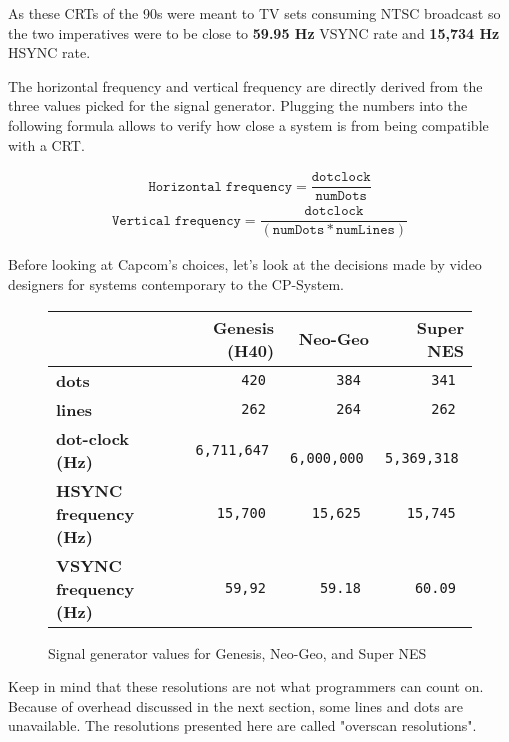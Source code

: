 As these CRTs of the 90s were meant to TV sets consuming NTSC broadcast so the two imperatives were to be close to \textbf{59.95 Hz} VSYNC rate and \textbf{15,734 Hz} HSYNC rate. 



The horizontal frequency and vertical frequency are directly derived from the three values picked for the signal generator. Plugging the numbers into the following formula allows to verify how close a system is from being compatible with a CRT.

\begin{align*}
 \mathtt{Horizontal\; frequency} = \dfrac{\mathtt{dotclock}}{\mathtt{numDots}}
\end{align*}
\begin{align*}
\mathtt{Vertical\; frequency} =   \dfrac{\mathtt{dotclock}}{\mathtt{(numDots * numLines)}}
\end{align*}


Before looking at Capcom's choices, let's look at the decisions made by video designers for systems contemporary to the CP-System. 


\begin{figure}[H]
{ \setlength{\tabcolsep}{3.0pt}
\begin{tabularx}{\textwidth}{Xrrr} 
  \textbf{ } & \textbf{Genesis (H40)\cite{h40}} & \textbf{ Neo-Geo }  & \textbf{ Super NES } \\               
  \toprule    
   \textbf{dots} & \texttt{ 420 } & \texttt{ 384 }  & \texttt{ 341 } \\ 
   \textbf{lines} & \texttt{ 262 } & \texttt{ 264 }  & \texttt{ 262 } \\ 
   \textbf{dot-clock (Hz)} & \texttt{  6,711,647 } & \texttt{ 6,000,000 }  & \texttt{ 5,369,318 } \\ 
\toprule    
   \textbf{HSYNC frequency (Hz) } & \texttt{ 15,700 } & \texttt{ 15,625 }  & \texttt{ 15,745 } \\ 
   \textbf{VSYNC frequency (Hz) } & \texttt{ 59,92 } & \texttt{ 59.18 }  & \texttt{ 60.09 } \\ 
\toprule    

\end{tabularx}%
}\caption*{Signal generator values for Genesis, Neo-Geo, and Super NES}
\end{figure}

Keep in mind that these resolutions are not what programmers can count on. Because of overhead discussed in the next section, some lines and dots are unavailable. The resolutions presented here are called "overscan resolutions".


